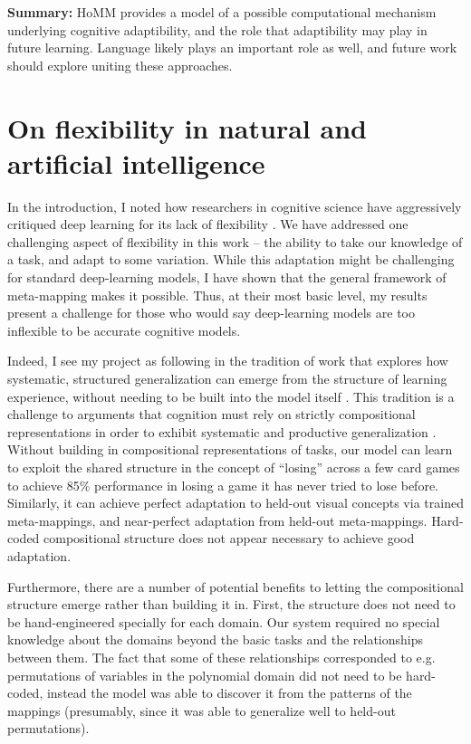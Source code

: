 \textbf{Summary:} HoMM provides a model of a possible computational mechanism underlying cognitive adaptibility, and the role that adaptibility may play in future learning. Language likely plays an important role as well, and future work should explore uniting these approaches. 

\section{On flexibility in natural and artificial intelligence}

In the introduction, I noted how researchers in cognitive science have aggressively critiqued deep learning for its lack of flexibility \citep[e.g.][]{Lake2015, Lake2016, Lake2017, Marcus2018}. We have addressed one challenging aspect of flexibility in this work -- the ability to take our knowledge of a task, and adapt to some variation. While this adaptation might be challenging for standard deep-learning models, I have shown that the general framework of meta-mapping makes it possible. Thus, at their most basic level, my results present a challenge for those who would say deep-learning models are too inflexible to be accurate cognitive models. \par  

Indeed, I see my project as following in the tradition of work that explores how systematic, structured generalization can emerge from the structure of learning experience, without needing to be built into the model itself \citep{McClelland2010a, McClelland2010, Hansen2017}. This tradition is a challenge to arguments that cognition must rely on strictly compositional representations in order to exhibit systematic and productive generalization \citep[e.g.][]{Fodor2001, Fodor2008lot2, Lake2017}. Without building in compositional representations of tasks, our model can learn to exploit the shared structure in the concept of ``losing'' across a few card games to achieve 85\% performance in losing a game it has never tried to lose before. Similarly, it can achieve perfect adaptation to held-out visual concepts via trained meta-mappings, and near-perfect adaptation from held-out meta-mappings. Hard-coded compositional structure does not appear necessary to achieve good adaptation. \par 

Furthermore, there are a number of potential benefits to letting the compositional structure emerge rather than building it in. First, the structure does not need to be hand-engineered specially for each domain. Our system required no special knowledge about the domains beyond the basic tasks and the relationships between them. The fact that some of these relationships corresponded to e.g. permutations of variables in the polynomial domain did not need to be hard-coded, instead the model was able to discover it from the patterns of the mappings (presumably, since it was able to generalize well to held-out permutations). \par

